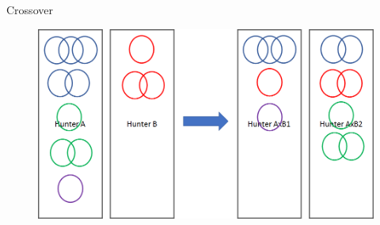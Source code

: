 \documentclass{beamer}
\begin{document}
\begin{frame}{Crossover}

\begin{figure}
	\centering
	\includegraphics[width=0.7\linewidth]{figures/png/HunterCrossover}

	\label{fig:huntercrossover}
\end{figure}
\end{frame}
\end{document}

